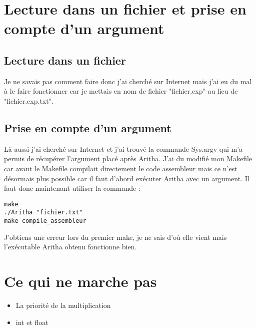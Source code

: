\documentclass{article}
\begin{document}
\section{Lecture dans un fichier et prise en compte d'un argument}

\subsection{Lecture dans un fichier}
Je ne savais pas comment faire donc j'ai cherché sur Internet mais j'ai eu du mal à le faire fonctionner car je mettais en nom de fichier "fichier.exp" au lieu de "fichier.exp.txt".

\subsection{Prise en compte d'un argument}
Là aussi j'ai cherché sur Internet et j'ai trouvé la commande Sys.argv qui m'a permis de récupérer l'argument placé après Aritha. J'ai du modifié mon Makefile car avant le Makefile compilait directement le code assembleur mais ce n'est désormais plus possible car il faut d'abord exécuter Aritha avec un argument. Il faut donc maintenant utiliser la commande :
\begin{lstlisting}
make
./Aritha "fichier.txt"
make compile_assembleur
\end{lstlisting}
J'obtiens une erreur lors du premier make, je ne sais d'où elle vient mais l'exécutable Aritha obtenu fonctionne bien.

\section{Ce qui ne marche pas}
\begin{itemize}
\item La priorité de la multiplication
\item int et float
\end{itemize}
\end{document}
